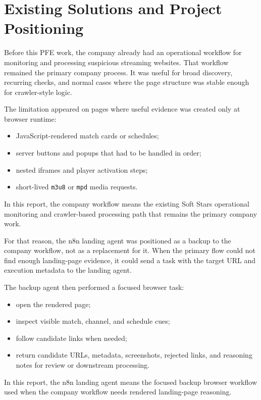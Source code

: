 

\section{Existing Solutions and Project Positioning}

Before this PFE work, the company already had an operational workflow for monitoring
and processing suspicious streaming websites. That workflow remained the primary
company process. It was useful for broad discovery, recurring checks, and normal cases
where the page structure was stable enough for crawler-style logic.

The limitation appeared on pages where useful evidence was created only at browser
runtime:
\begin{itemize}
  \item JavaScript-rendered match cards or schedules;
  \item server buttons and popups that had to be handled in order;
  \item nested iframes and player activation steps;
  \item short-lived \texttt{m3u8} or \texttt{mpd} media requests.
\end{itemize}

In this report, the company workflow means the existing Soft Stars operational
monitoring and crawler-based processing path that remains the primary company work.



For that reason, the n8n landing agent was positioned as a backup to the company workflow,
not as a replacement for it. When the primary flow could not find enough landing-page
evidence, it could send a task with the target URL and execution metadata to the
landing agent.

The backup agent then performed a focused browser task:
\begin{itemize}
  \item open the rendered page;
  \item inspect visible match, channel, and schedule cues;
  \item follow candidate links when needed;
  \item return candidate URLs, metadata, screenshots, rejected links, and reasoning
  notes for review or downstream processing.
\end{itemize}

In this report, the n8n landing agent means the focused backup browser workflow used
when the company workflow needs rendered landing-page reasoning.

